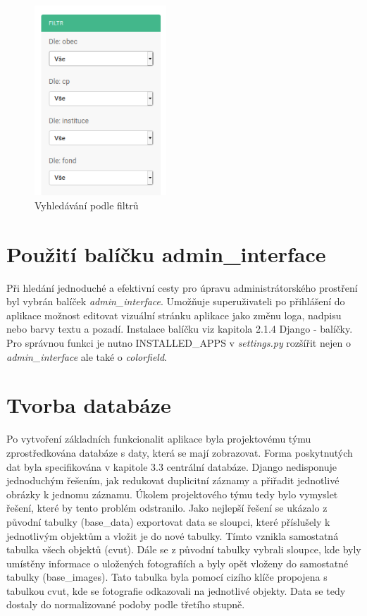 \begin{figure}[H] \centering
    \includegraphics[width=140pt]{./pictures/22-filtry.PNG}
    \caption[Vyhledávání podle filtrů]{Vyhledávání podle filtrů}
	\label{fig:Vyhledávání podle filtrů}              
\end{figure}

\section{Použití balíčku admin\_interface}

Při hledání jednoduché a efektivní cesty pro úpravu administrátorského prostření byl vybrán balíček \emph{admin\_interface}. Umožňuje superuživateli po přihlášení do aplikace možnost editovat vizuální stránku aplikace jako změnu loga, nadpisu nebo barvy textu a pozadí. Instalace balíčku viz kapitola 2.1.4 Django - balíčky. Pro správnou funkci je nutno INSTALLED\_APPS v \emph{settings.py} rozšířit nejen o \emph{admin\_interface} ale také o \emph{colorfield}.



\section{Tvorba databáze}

Po vytvoření základních funkcionalit aplikace byla projektovému týmu zprostředkována databáze s daty, která se mají zobrazovat. Forma poskytnutých dat byla specifikována v kapitole 3.3 centrální databáze. Django nedisponuje jednoduchým řešením, jak redukovat duplicitní záznamy a přiřadit jednotlivé obrázky k jednomu záznamu. Úkolem projektového týmu tedy bylo vymyslet řešení, které by tento problém odstranilo. Jako nejlepší řešení se ukázalo z původní tabulky (base\_data) exportovat data se sloupci, které příslušely k jednotlivým objektům a vložit je do nové tabulky. Tímto vznikla samostatná tabulka všech objektů (cvut). Dále se z původní tabulky vybrali sloupce, kde byly umístěny informace o uložených fotografiích a byly opět vloženy do samostatné tabulky (base\_images). Tato tabulka byla pomocí cizího klíče propojena s tabulkou cvut, kde se fotografie odkazovali na jednotlivé objekty. Data se tedy dostaly do normalizované podoby podle třetího stupně.


